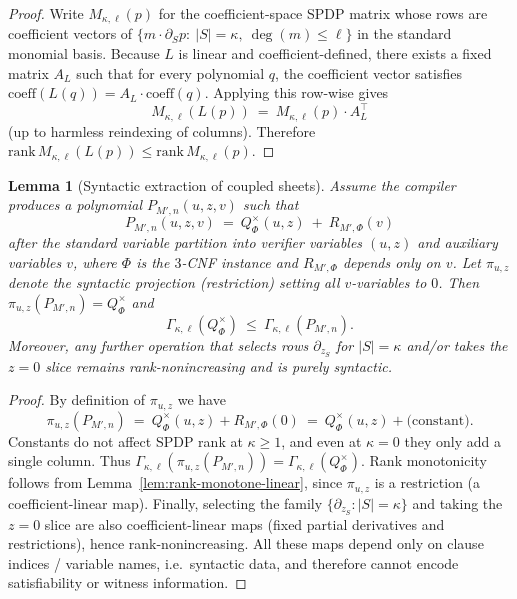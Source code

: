 \documentclass[12pt]{article}
\newtheorem{lemma}[theorem]{Lemma}
\theoremstyle{definition}
\theoremstyle{definition}
\theoremstyle{remark}
\theoremstyle{remark}
\begin{document}
\begin{proof}
Write $M_{\kappa,\ell}(p)$ for the coefficient-space SPDP matrix whose rows are coefficient vectors of
$\{m\cdot \partial_S p:\ |S|=\kappa,\ \deg(m)\le \ell\}$ in the standard monomial basis.
Because $L$ is linear and coefficient-defined, there exists a fixed matrix $A_L$ such that
for every polynomial $q$, the coefficient vector satisfies $\mathrm{coeff}(L(q))=A_L\cdot \mathrm{coeff}(q)$.
Applying this row-wise gives
\[
M_{\kappa,\ell}(L(p))\ =\ M_{\kappa,\ell}(p)\cdot A_L^{\top}
\]
(up to harmless reindexing of columns). Therefore
$\mathrm{rank}\,M_{\kappa,\ell}(L(p))\le \mathrm{rank}\,M_{\kappa,\ell}(p)$.
\end{proof}

\begin{lemma}[Syntactic extraction of coupled sheets]\label{lem:syntactic-extraction}
Assume the compiler produces a polynomial $P_{M',n}(u,z,v)$ such that
\[
P_{M',n}(u,z,v)\ =\ Q_\Phi^{\times}(u,z)\ +\ R_{M',\Phi}(v)
\]
after the standard variable partition into verifier variables $(u,z)$ and auxiliary variables $v$,
where $\Phi$ is the $3$-CNF instance and $R_{M',\Phi}$ depends only on $v$.
Let $\pi_{u,z}$ denote the syntactic projection (restriction) setting all $v$-variables to $0$.
Then $\pi_{u,z}(P_{M',n}) = Q_\Phi^{\times}$ and
\[
\Gamma_{\kappa,\ell}(Q_\Phi^{\times})\ \le\ \Gamma_{\kappa,\ell}(P_{M',n}).
\]
Moreover, any further operation that selects rows $\partial_{z_S}$ for $|S|=\kappa$ and/or
takes the $z=0$ slice remains rank-nonincreasing and is purely syntactic.
\end{lemma}

\begin{proof}
By definition of $\pi_{u,z}$ we have
\[
\pi_{u,z}(P_{M',n})\ =\ Q_\Phi^{\times}(u,z) + R_{M',\Phi}(0)\ =\ Q_\Phi^{\times}(u,z) + \text{(constant)}.
\]
Constants do not affect SPDP rank at $\kappa\ge 1$, and even at $\kappa=0$ they only add a single column.
Thus $\Gamma_{\kappa,\ell}(\pi_{u,z}(P_{M',n}))=\Gamma_{\kappa,\ell}(Q_\Phi^{\times})$.
Rank monotonicity follows from Lemma~\ref{lem:rank-monotone-linear}, since $\pi_{u,z}$ is a restriction
(a coefficient-linear map).
Finally, selecting the family $\{\partial_{z_S}:|S|=\kappa\}$ and taking the $z=0$ slice are also
coefficient-linear maps (fixed partial derivatives and restrictions), hence rank-nonincreasing.
All these maps depend only on clause indices / variable names, i.e.\ syntactic data, and therefore
cannot encode satisfiability or witness information.
\end{proof}
\end{document}
